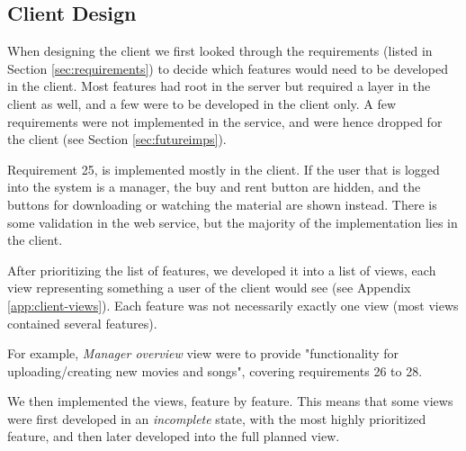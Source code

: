 \subsection{Client Design}

When designing the client we first looked through the requirements (listed in
Section \ref{sec:requirements}) to decide which features would need to be
developed in the client. Most features had root in the server but required a
layer in the client as well, and a few were to be developed in the client only.
A few requirements were not implemented in the service, and were hence dropped
for the client (see Section \ref{sec:futureimps}).

Requirement 25, is implemented mostly in the client. If the user
that is logged into the system is a manager, the buy and rent button are hidden,
and the buttons for downloading or watching the material are shown instead. There
is some validation in the web service, but the majority of the implementation lies
in the client.

After prioritizing the list of features, we developed it into a list of views,
each view representing something a user of the client would see (see Appendix
\ref{app:client-views}). Each feature was not necessarily exactly one view (most
views contained several features).

For example, \emph{Manager overview} view were to provide "functionality
for uploading/creating new movies and songs", covering requirements 26 to 28.

We then implemented the views, feature by feature. This means that some views
were first developed in an \emph{incomplete} state, with the most highly
prioritized feature, and then later developed into the full planned view.


